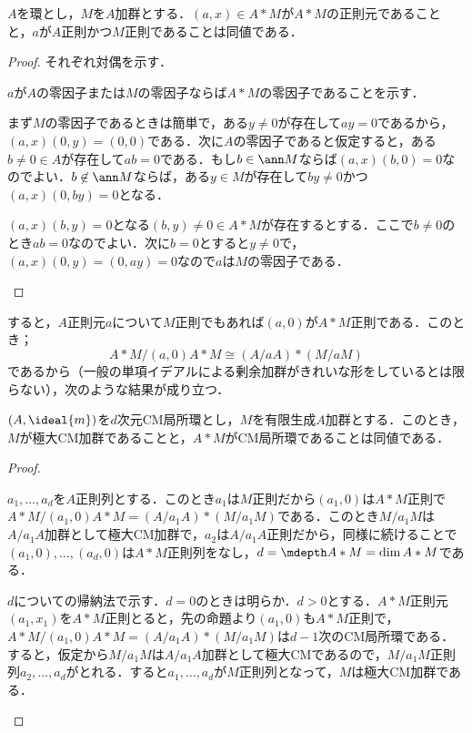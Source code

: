 \begin{prop}
	$A$を環とし，$M$を$A$加群とする．$(a,x)\in A*M$が$A*M$の正則元であることと，$a$が$A$正則かつ$M$正則であることは同値である．
\end{prop}

\begin{proof}
	それぞれ対偶を示す．
	\begin{eqv}
		\item $a$が$A$の零因子または$M$の零因子ならば$A*M$の零因子であることを示す．
		
		まず$M$の零因子であるときは簡単で，ある$y\neq 0$が存在して$ay=0$であるから，$(a,x)(0,y)=(0,0)$である．次に$A$の零因子であると仮定すると，ある$b\neq0\in A$が存在して$ab=0$である．もし$b\in\ann M$ならば$(a,x)(b,0)=0$なのでよい．$b\not\in\ann M$ならば，ある$y\in M$が存在して$by\neq 0$かつ$(a,x)(0,by)=0$となる．
		
		\item $(a,x)(b,y)=0$となる$(b,y)\neq 0\in A*M$が存在するとする．ここで$b\neq 0$のとき$ab=0$なのでよい．次に$b=0$とすると$y\neq 0$で，$(a,x)(0,y)=(0,ay)=0$なので$a$は$M$の零因子である．
	\end{eqv}
\end{proof}

すると，$A$正則元$a$について$M$正則でもあれば$(a,0)$が$A*M$正則である．このとき；
\[A*M/(a,0)A*M\cong (A/aA)*(M/aM)\]
であるから（一般の単項イデアルによる剰余加群がきれいな形をしているとは限らない），次のような結果が成り立つ．

\begin{prop}\label{prop:MCMなら拡大してもCM}
	$(A,\ideal{m})$を$d$次元CM局所環とし，$M$を有限生成$A$加群とする．このとき，$M$が極大CM加群であることと，$A*M$がCM局所環であることは同値である．
\end{prop}

\begin{proof}
	\begin{eqv}
		\item $a_1,\dots,a_d$を$A$正則列とする．このとき$a_1$は$M$正則だから$(a_1,0)$は$A*M$正則で$A*M/(a_1,0)A*M=(A/a_1A)*(M/a_1M)$である．このとき$M/a_1M$は$A/a_1A$加群として極大CM加群で，$a_2$は$A/a_1A$正則だから，同様に続けることで$(a_1,0),\dots,(a_d,0)$は$A*M$正則列をなし，$d=\mdepth A*M=\dim A*M$である．
		\item $d$についての帰納法で示す．$d=0$のときは明らか．$d>0$とする．$A*M$正則元$(a_1,x_1)$を$A*M$正則とると，先の命題より$(a_1,0)$も$A*M$正則で，$A*M/(a_1,0)A*M=(A/a_1A)*(M/a_1M)$は$d-1$次のCM局所環である．すると，仮定から$M/a_1M$は$A/a_1A$加群として極大CMであるので，$M/a_1M$正則列$a_2,\dots,a_d$がとれる．すると$a_1,\dots,a_d$が$M$正則列となって，$M$は極大CM加群である．
	\end{eqv}
\end{proof}

